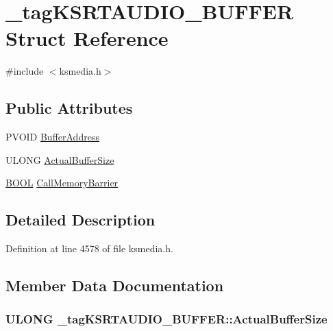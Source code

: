 \hypertarget{struct__tag_k_s_r_t_a_u_d_i_o___b_u_f_f_e_r}{}\section{\+\_\+tag\+K\+S\+R\+T\+A\+U\+D\+I\+O\+\_\+\+B\+U\+F\+F\+ER Struct Reference}
\label{struct__tag_k_s_r_t_a_u_d_i_o___b_u_f_f_e_r}


{\ttfamily \#include $<$ksmedia.\+h$>$}

\subsection*{Public Attributes}
\begin{DoxyCompactItemize}
\item 
P\+V\+O\+ID \hyperlink{struct__tag_k_s_r_t_a_u_d_i_o___b_u_f_f_e_r_aa5e3cc1a7269df0a451e6d087991098c}{Buffer\+Address}
\item 
U\+L\+O\+NG \hyperlink{struct__tag_k_s_r_t_a_u_d_i_o___b_u_f_f_e_r_accae71f3b524b811c72163fc3e9db8d6}{Actual\+Buffer\+Size}
\item 
\hyperlink{nfilterkit_8h_a3be13892ae7076009afcf121347dd319}{B\+O\+OL} \hyperlink{struct__tag_k_s_r_t_a_u_d_i_o___b_u_f_f_e_r_a4594c680b1a921fe13e37bf2d278f703}{Call\+Memory\+Barrier}
\end{DoxyCompactItemize}


\subsection{Detailed Description}


Definition at line 4578 of file ksmedia.\+h.



\subsection{Member Data Documentation}
\subsubsection[{\texorpdfstring{Actual\+Buffer\+Size}{ActualBufferSize}}]{\setlength{\rightskip}{0pt plus 5cm}U\+L\+O\+NG \+\_\+tag\+K\+S\+R\+T\+A\+U\+D\+I\+O\+\_\+\+B\+U\+F\+F\+E\+R\+::\+Actual\+Buffer\+Size}\hypertarget{struct__tag_k_s_r_t_a_u_d_i_o___b_u_f_f_e_r_accae71f3b524b811c72163fc3e9db8d6}{}\label{struct__tag_k_s_r_t_a_u_d_i_o___b_u_f_f_e_r_accae71f3b524b811c72163fc3e9db8d6}


